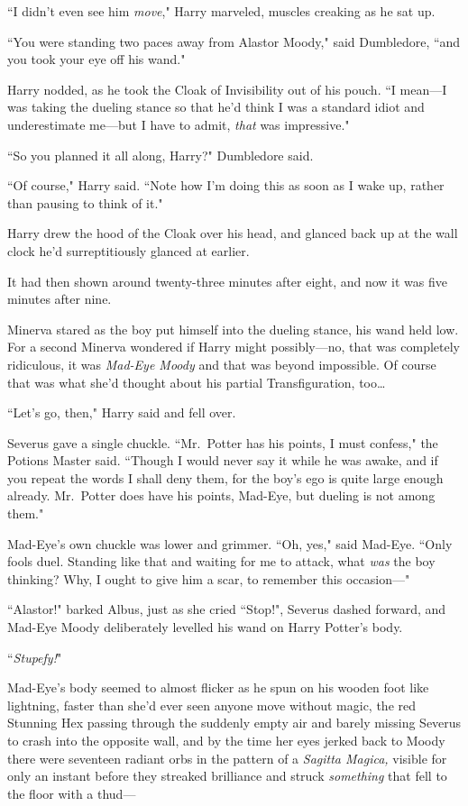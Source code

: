 ``I didn't even see him \emph{move}," Harry marveled, muscles creaking as he sat up.

``You were standing two paces away from Alastor Moody," said Dumbledore, ``and you took your eye off his wand."

Harry nodded, as he took the Cloak of Invisibility out of his pouch. ``I mean—I was taking the dueling stance so that he'd think I was a standard idiot and underestimate me—but I have to admit, \emph{that} was impressive."

``So you planned it all along, Harry?" Dumbledore said.

``Of course," Harry said. ``Note how I'm doing this as soon as I wake up, rather than pausing to think of it."

Harry drew the hood of the Cloak over his head, and glanced back up at the wall clock he'd surreptitiously glanced at earlier.

It had then shown around twenty-three minutes after eight, and now it was five minutes after nine.

\later

Minerva stared as the boy put himself into the dueling stance, his wand held low. For a second Minerva wondered if Harry might possibly—no, that was completely ridiculous, it was \emph{Mad-Eye Moody} and that was beyond impossible. Of course that was what she'd thought about his partial Transfiguration, too{\ldots}

``Let's go, then," Harry said and fell over.

Severus gave a single chuckle. ``Mr.~Potter has his points, I must confess," the Potions Master said. ``Though I would never say it while he was awake, and if you repeat the words I shall deny them, for the boy's ego is quite large enough already. Mr.~Potter does have his points, Mad-Eye, but dueling is not among them."

Mad-Eye's own chuckle was lower and grimmer. ``Oh, yes," said Mad-Eye. ``Only fools duel. Standing like that and waiting for me to attack, what \emph{was} the boy thinking? Why, I ought to give him a scar, to remember this occasion—"

``Alastor!" barked Albus, just as she cried ``Stop!", Severus dashed forward, and Mad-Eye Moody deliberately levelled his wand on Harry Potter's body.

``\emph{Stupefy!}"

Mad-Eye's body seemed to almost flicker as he spun on his wooden foot like lightning, faster than she'd ever seen anyone move without magic, the red Stunning Hex passing through the suddenly empty air and barely missing Severus to crash into the opposite wall, and by the time her eyes jerked back to Moody there were seventeen radiant orbs in the pattern of a \emph{Sagitta Magica,} visible for only an instant before they streaked brilliance and struck \emph{something} that fell to the floor with a thud—

